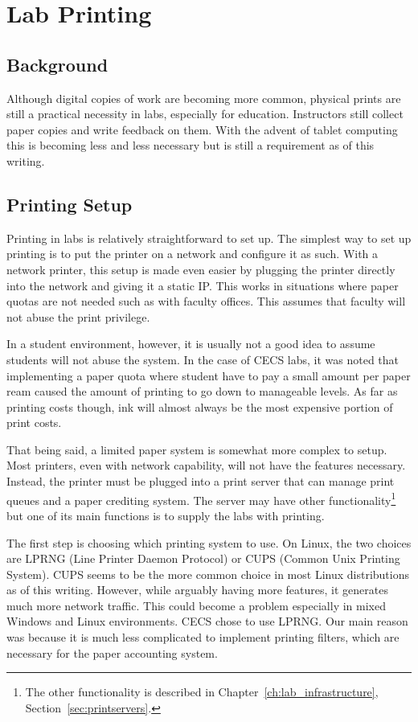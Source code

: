 \section{Lab Printing} \label{sec:lab_printing}
\subsection{Background}
Although digital copies of work are becoming more common, physical prints are still a practical necessity in labs, especially for education.  Instructors still collect paper copies and write feedback on them.  With the advent of tablet computing this is becoming less and less necessary but is still a requirement as of this writing.  

\subsection{Printing Setup}
Printing in labs is relatively straightforward to set up.  The simplest way to set up printing is to put the printer on a network and configure it as such.  With a network printer, this setup is made even easier by plugging the printer directly into the network and giving it a static IP.  This works in situations where paper quotas are not needed such as with faculty offices.  This assumes that faculty will not abuse the print privilege.  

In a student environment, however, it is usually not a good idea to assume students will not abuse the system.  In the case of CECS labs, it was noted that implementing a paper quota where student have to pay a small amount per paper ream caused the amount of printing to go down to manageable levels.  As far as printing costs though, ink will almost always be the most expensive portion of print costs.  

That being said, a limited paper system is somewhat more complex to setup.  Most printers, even with network capability, will not have the features necessary.  Instead, the printer must be plugged into a print server that can manage print queues and a paper crediting system.  The server may have other functionality\footnote{The other functionality is described in Chapter~\ref{ch:lab_infrastructure}, Section~\ref{sec:printservers}.} but one of its main functions is to supply the labs with printing.  

The first step is choosing which printing system to use.  On Linux, the two choices are LPRNG (Line Printer Daemon Protocol) or CUPS (Common Unix Printing System).  CUPS seems to be the more common choice in most Linux distributions as of this writing.  However, while arguably having more features, it generates much more network traffic.  This could become a problem especially in mixed Windows and Linux environments.  CECS chose to use LPRNG.  Our main reason was because it is much less complicated to implement printing filters, which are necessary for the paper accounting system.

